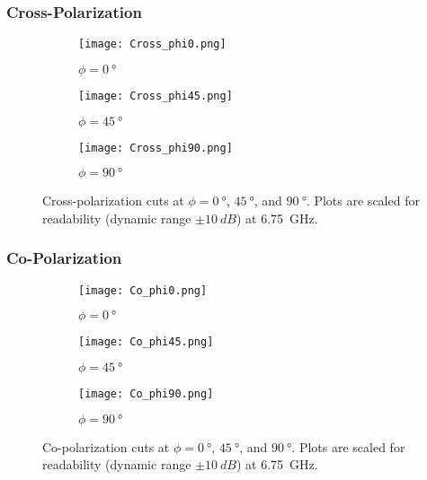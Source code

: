 \documentclass[11pt]{article}
\begin{document}
\subsubsection{Cross-Polarization}
\begin{figure}[H]
  \centering

  \begin{subfigure}[b]{\rowwidth}
    \centering
    \texttt{[image: Cross\_phi0.png]}
    \caption{$\phi=\SI{0}{\degree}$}
    \label{fig:cross-phi0}
  \end{subfigure}


  \begin{subfigure}[b]{\rowwidth}
    \centering
    \texttt{[image: Cross\_phi45.png]}
    \caption{$\phi=\SI{45}{\degree}$}
    \label{fig:cross-phi45}
  \end{subfigure}


  \begin{subfigure}[b]{\rowwidth}
    \centering
    \texttt{[image: Cross\_phi90.png]}
    \caption{$\phi=\SI{90}{\degree}$}
    \label{fig:cross-phi90}
  \end{subfigure}

  \caption{Cross-polarization cuts at $\phi=\SI{0}{\degree}$, $\SI{45}{\degree}$, and $\SI{90}{\degree}$. Plots are scaled for readability (dynamic range $\pm\SI{10}{dB}$) at \SI{6.75}{GHz}.}
  \label{fig:cross-cuts}
\end{figure}

\subsubsection{Co-Polarization}
\begin{figure}[H]
  \centering

  \begin{subfigure}[b]{\rowwidth}
    \centering
    \texttt{[image: Co\_phi0.png]}
    \caption{$\phi=\SI{0}{\degree}$}
    \label{fig:co-phi0}
  \end{subfigure}

  \medskip

  \begin{subfigure}[b]{\rowwidth}
    \centering
    \texttt{[image: Co\_phi45.png]}
    \caption{$\phi=\SI{45}{\degree}$}
    \label{fig:co-phi45}
  \end{subfigure}

  \medskip

  \begin{subfigure}[b]{\rowwidth}
    \centering
    \texttt{[image: Co\_phi90.png]}
    \caption{$\phi=\SI{90}{\degree}$}
    \label{fig:co-phi90}
  \end{subfigure}

  \caption{Co-polarization cuts at $\phi=\SI{0}{\degree}$, $\SI{45}{\degree}$, and $\SI{90}{\degree}$. Plots are scaled for readability (dynamic range $\pm\SI{10}{dB}$) at \SI{6.75}{GHz}.}
  \label{fig:co-cuts}
\end{figure}
\end{document}
